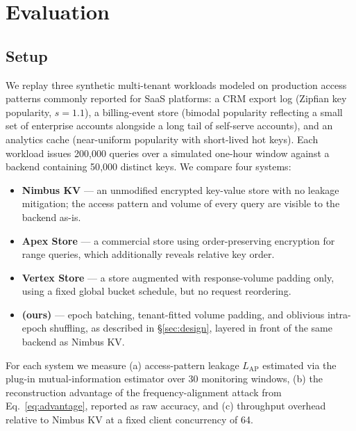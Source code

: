 \section{Evaluation}
\label{sec:evaluation}

\subsection{Setup}
We replay three synthetic multi-tenant workloads modeled on production
access patterns commonly reported for SaaS platforms: a CRM export log
(Zipfian key popularity, $s = 1.1$), a billing-event store (bimodal
popularity reflecting a small set of enterprise accounts alongside a long
tail of self-serve accounts), and an analytics cache (near-uniform
popularity with short-lived hot keys). Each workload issues 200{,}000
queries over a simulated one-hour window against a backend containing
50{,}000 distinct keys. We compare four systems:

\begin{itemize}[leftmargin=*]
  \item \textbf{Nimbus KV} --- an unmodified encrypted key-value store
  with no leakage mitigation; the access pattern and volume of every
  query are visible to the backend as-is.
  \item \textbf{Apex Store} --- a commercial store using order-preserving
  encryption for range queries, which additionally reveals relative key
  order.
  \item \textbf{Vertex Store} --- a store augmented with response-volume
  padding only, using a fixed global bucket schedule, but no request
  reordering.
  \item \textbf{\sysname{} (ours)} --- epoch batching, tenant-fitted
  volume padding, and oblivious intra-epoch shuffling, as described in
  \S\ref{sec:design}, layered in front of the same backend as Nimbus KV.
\end{itemize}

For each system we measure (a) access-pattern leakage $L_{\mathrm{AP}}$
estimated via the plug-in mutual-information estimator over 30 monitoring
windows, (b) the reconstruction advantage of the frequency-alignment
attack from Eq.~\ref{eq:advantage}, reported as raw accuracy, and (c)
throughput overhead relative to Nimbus KV at a fixed client concurrency of
64.

